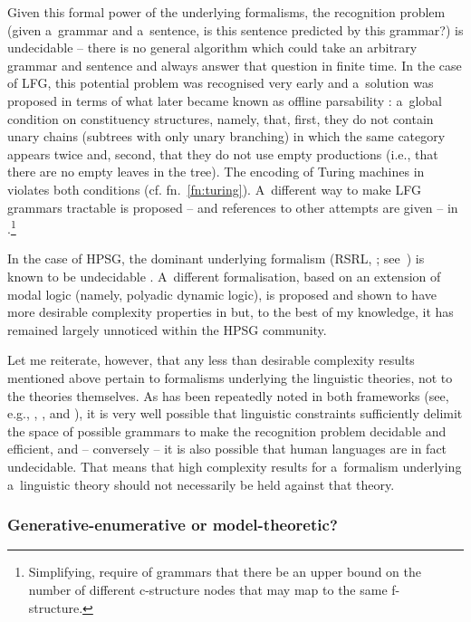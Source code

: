 \documentclass[output=paper,hidelinks]{langscibook}
\begin{document}
Given this formal power of the underlying formalisms, the recognition problem (given a~grammar and a~sentence, is this sentence predicted by this grammar?) is undecidable -- there is no general algorithm which could take an arbitrary grammar and sentence and always answer that question in finite time.  In the case of LFG, this potential problem was recognised very early and a~solution was proposed \citep[266--267]{kaplanbresnan82} in terms of what later became known as offline parsability \citep[142]{per:war:83}: a~global condition on constituency structures, namely, that, first, they do not contain unary chains (subtrees with only unary branching) in which the same category appears twice and, second, that they do not use empty productions (i.e., that there are no empty leaves in the tree).  The encoding of Turing machines in \citet[Section {6.2}]{fra:win:12} violates both conditions (cf. fn.~\ref{fn:turing}).  A~different way to make LFG grammars tractable is proposed -- and references to other attempts are given -- in \citet{wed:kap:20}.\footnote{Simplifying, \citet{wed:kap:20} require of grammars that there be an upper bound on the number of different c-structure nodes that may map to the same f-structure.}

In the case of HPSG, the dominant underlying formalism (RSRL, \citealt{rich:98a,rich:04}; see~) is known to be undecidable \citep{keps2:04}.  A~different formalisation, based on an extension of modal logic (namely, polyadic dynamic logic), is proposed and shown to have more desirable complexity properties in \citet{sog:lan:09} but, to the best of my knowledge, it has remained largely unnoticed within the HPSG community.

Let me reiterate, however, that any less than desirable complexity results mentioned above pertain to formalisms underlying the linguistic theories, not to the theories themselves.  As has been repeatedly noted in both frameworks (see, e.g., \citealt[271--272]{kaplanbresnan82}, \citealt[94--95]{john:88:book}, and \citealt[242--243]{rich:04}), it is very well possible that linguistic constraints sufficiently delimit the space of possible grammars to make the recognition problem decidable and efficient, and -- conversely -- it is also possible that human languages are in fact undecidable.  That means that high complexity results for a~formalism underlying a~linguistic theory should not necessarily be held against that theory.


\subsubsection{Generative-enumerative or model-theoretic?}
\label{sec:gram:pull}
\end{document}
